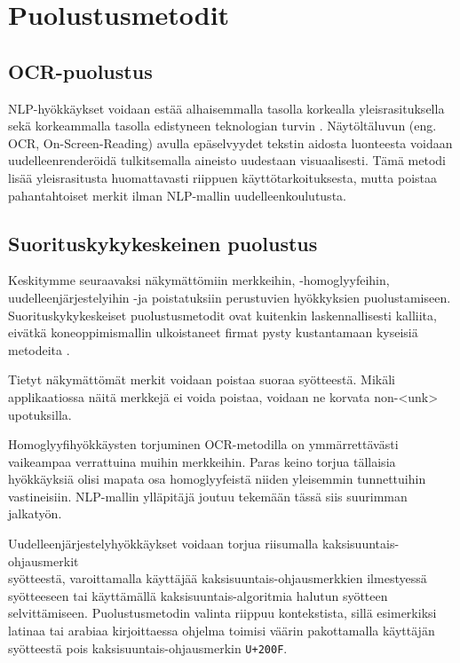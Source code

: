 \chapter{Puolustusmetodit\label{results}}

\section{OCR-puolustus}
NLP-hyökkäykset voidaan estää alhaisemmalla tasolla korkealla yleisrasituksella sekä korkeammalla tasolla edistyneen teknologian turvin \citep{boucher2021bad}. Näytöltäluvun (eng. OCR, On-Screen-Reading) avulla epäselvyydet tekstin aidosta luonteesta voidaan uudelleenrenderöidä tulkitsemalla aineisto uudestaan visuaalisesti. Tämä metodi lisää yleisrasitusta huomattavasti riippuen käyttötarkoituksesta, mutta poistaa pahantahtoiset merkit ilman NLP-mallin uudelleenkoulutusta.

\section{Suorituskykykeskeinen puolustus}
Keskitymme seuraavaksi näkymättömiin merkkeihin, -homoglyyfeihin, \-uudelleenjärjestelyihin -ja poistatuksiin perustuvien hyökkyksien puolustamiseen. Suorituskykykeskeiset puolustusmetodit ovat kuitenkin laskennallisesti kalliita, eivätkä koneoppimismallin ulkoistaneet firmat pysty kustantamaan kyseisiä metodeita \citep{https://doi.org/10.48550/arxiv.1911.07399}.

Tietyt näkymättömät merkit voidaan poistaa suoraa syötteestä. Mikäli applikaatiossa näitä merkkejä ei voida poistaa, voidaan ne korvata non-<unk> upotuksilla.

Homoglyyfihyökkäysten torjuminen OCR-metodilla on ymmärrettävästi vaikeampaa verrattuina muihin merkkeihin. Paras keino torjua tällaisia hyökkäyksiä olisi mapata osa homoglyyfeistä niiden yleisemmin tunnettuihin vastineisiin. NLP-mallin ylläpitäjä joutuu tekemään tässä siis suurimman jalkatyön.

Uudelleenjärjestelyhyökkäykset voidaan torjua riisumalla kaksisuuntais-ohjausmerkit\\syötteestä, varoittamalla käyttäjää kaksisuuntais-ohjausmerkkien ilmestyessä syötteeseen tai käyttämällä kaksisuuntais-algoritmia halutun syötteen selvittämiseen. Puolustusmetodin valinta riippuu kontekstista, sillä esimerkiksi latinaa tai arabiaa kirjoittaessa ohjelma toimisi väärin pakottamalla käyttäjän syötteestä pois kaksisuuntais-ohjausmerkin \texttt{U+200F}.

